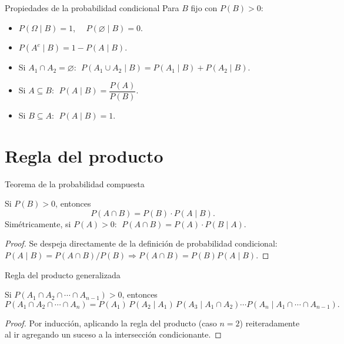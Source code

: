 \documentclass[aspectratio=169,11pt]{beamer}
\begin{document}
\begin{frame}{Propiedades de la probabilidad condicional}
Para $B$ fijo con $P(B)>0$:
\begin{itemize}
\item $P(\Omega \mid B) = 1$, $\quad P(\varnothing\mid B) = 0$.
\item $P(A^c \mid B) = 1 - P(A\mid B)$.
\item Si $A_1\cap A_2 = \varnothing$: $\; P(A_1\cup A_2 \mid B) = P(A_1\mid B) + P(A_2\mid B)$.
\item Si $A \subseteq B$: $\; P(A\mid B) = \dfrac{P(A)}{P(B)}$.
\item Si $B \subseteq A$: $\; P(A \mid B) = 1$.
\end{itemize}
\end{frame}

\section{Regla del producto}

\begin{frame}{Teorema de la probabilidad compuesta}
\begin{theorem}
Si $P(B) > 0$, entonces
\[
P(A \cap B) = P(B)\cdot P(A\mid B).
\]
Simétricamente, si $P(A)>0$: $\; P(A\cap B) = P(A) \cdot P(B\mid A)$.
\end{theorem}
\begin{proof}
Se despeja directamente de la definición de probabilidad condicional: $P(A\mid B) = P(A\cap B)/P(B) \Rightarrow P(A\cap B) = P(B)P(A\mid B)$.
\end{proof}
\end{frame}

\begin{frame}{Regla del producto generalizada}
\begin{theorem}
Si $P(A_1\cap A_2 \cap \cdots \cap A_{n-1}) > 0$, entonces
\[
P(A_1\cap A_2\cap\cdots\cap A_n) = P(A_1)\,P(A_2\mid A_1)\,P(A_3\mid A_1\cap A_2)\cdots P(A_n \mid A_1\cap\cdots\cap A_{n-1}).
\]
\end{theorem}
\begin{proof}
Por inducción, aplicando la regla del producto (caso $n=2$) reiteradamente al ir agregando un suceso a la intersección condicionante.
\end{proof}
\end{frame}
\end{document}
